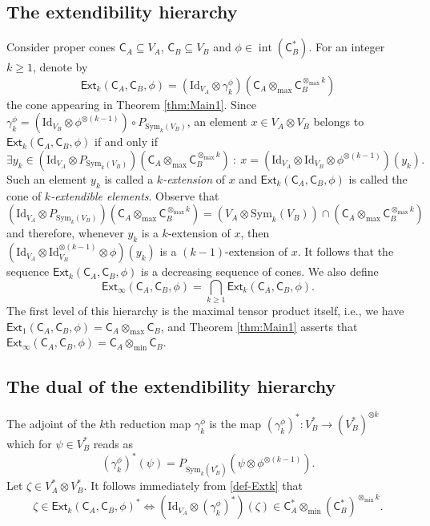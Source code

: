 \documentclass{amsart}
\newcommand{\iy}{\infty}
\newcommand{\st}{\ : \ }
\renewcommand{\geq}{\geqslant}
\renewcommand{\subset}{\subseteq}
\newcommand{\gC}{\mathsf{C}}
\newcommand{\Id}{\mathrm{Id}}
\newcommand{\Ext}{\mathsf{Ext}}
\newcommand{\Sym}{\mathrm{Sym}}
\DeclareMathOperator{\inter}{int}
\theoremstyle{plain}
\newcommand{\tmin}{{\otimes_{\min}}}
\newcommand{\tmax}{{\otimes_{\max}}}
\begin{document}
\subsection{The extendibility hierarchy}\label{sec:BasicsHierarchy}

Consider proper cones $\gC_A \subset V_A$, $\gC_B \subset V_B$ and $\phi \in \inter(\gC_B^*)$.
For an integer $k \geq 1$, denote by
\begin{equation} \label{def-Extk} \Ext_k(\gC_A,\gC_B,\phi) = (\Id_{V_A} \otimes \gamma_k^\phi) \left(\gC_A \tmax \gC_B^{\tmax k} \right) \end{equation}
the cone appearing in Theorem \ref{thm:Main1}. Since $\gamma_k^\phi = (\Id_{V_B} \otimes \phi^{\otimes(k-1)}) \circ P_{\Sym_k(V_B)}$, an element $x \in V_A \otimes V_B$ belongs to $\Ext_k(\gC_A,\gC_B,\phi)$ if and only if 
\[ \exists y_k \in \left( \Id_{V_A} \otimes P_{\Sym_k(V_B)} \right) \left( \gC_A \tmax \gC_B^{\tmax k} \right) \st
 x =  \left( \Id_{V_A} \otimes \Id_{V_B} \otimes \phi^{\otimes(k-1)} \right)(y_k). \] 
Such an element $y_k$ is called a \emph{$k$-extension} of $x$ and $\Ext_k(\gC_A,\gC_B,\phi)$ is called the cone of \emph{$k$-extendible elements}. Observe that
\[ \left( \Id_{V_A} \otimes P_{\Sym_k(V_B)} \right) \left( \gC_A \tmax \gC_B^{\tmax k} \right) 
= \left( V_A \otimes \Sym_k(V_B) \right) \cap \left( \gC_A \tmax \gC_B^{\tmax k} \right)
\]
and therefore, whenever $y_k$ is a $k$-extension of $x$, then $(\Id_{V_A} \otimes \Id_{V_B}^{\otimes (k-1)} \otimes \phi ) (y_k)$ is a $(k-1)$-extension of $x$. It follows that the sequence $\Ext_k(\gC_A,\gC_B,\phi)$ is a decreasing sequence of cones.
We also define 
\[
\Ext_\infty(\gC_A,\gC_B,\phi) = \bigcap_{k \geq 1}\Ext_k(\gC_A,\gC_B,\phi).
\]
The first level of this hierarchy is the maximal tensor product itself, i.e., we have $\Ext_1(\gC_A,\gC_B,\phi)=\gC_A \tmax \gC_B$, and Theorem \ref{thm:Main1} asserts that 
$\Ext_{\iy}(\gC_A,\gC_B,\phi)=\gC_A \tmin \gC_B$. 

\subsection{The dual of the extendibility hierarchy}\label{sec:dual}

The adjoint of the $k$th reduction map $\gamma_k^\phi$ is the map $(\gamma_k^\phi)^* : V_B^* \to (V_B^*)^{\otimes k}$ which for $\psi \in V_B^*$ reads as
\[ (\gamma_k^\phi)^*(\psi) = P_{\Sym_k(V_B^*)} ( \psi \otimes \phi^{\otimes(k-1)}). \]
Let $\zeta \in V_A^* \otimes V_B^*$. It follows immediately from \eqref{def-Extk} that
\begin{equation} \label{eq:Extk-dual}
\zeta \in \Ext_k(\gC_A,\gC_B,\phi)^* \iff (\Id_{V_A} \otimes (\gamma_k^\phi)^*)(\zeta) \in \gC_A^* \tmin (\gC_B^*)^{\tmin k}.
\end{equation}
\end{document}
